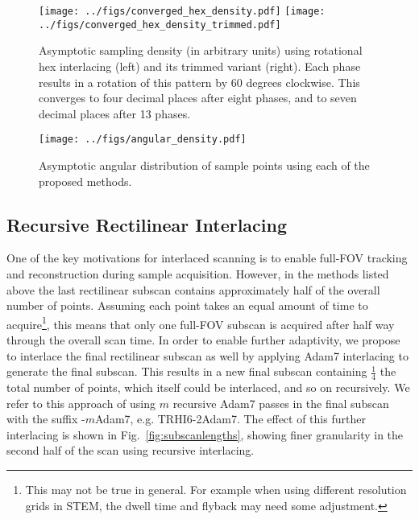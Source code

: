 \documentclass{article}
\newcommand{\reffig}[1]{Fig.~\ref{fig:#1}}
\begin{document}
\begin{figure}[ht]
\centering
\texttt{[image: ../figs/converged\_hex\_density.pdf]}
\texttt{[image: ../figs/converged\_hex\_density\_trimmed.pdf]}
\caption{
\label{fig:hexdensity}
	Asymptotic sampling density (in arbitrary units) using rotational hex interlacing (left) and its trimmed variant (right).
%
Each phase results in a rotation of this pattern by 60 degrees clockwise.
%
This converges to four decimal places after eight phases, and to seven decimal places after 13 phases.
%
%
%
}
\end{figure}


\begin{figure}
\centering
\texttt{[image: ../figs/angular\_density.pdf]}
\caption{
\label{fig:angdens} 
	Asymptotic angular distribution of sample points using each of the proposed methods.
}
\end{figure}

\subsection{Recursive Rectilinear Interlacing}
\label{sec:recursive}

One of the key motivations for interlaced scanning is to enable full-FOV
tracking and reconstruction during sample acquisition.
%
However, in the methods listed above the last rectilinear subscan contains approximately half of the overall number of points.
%
Assuming each point takes an equal amount of time to acquire\footnote{This may not be true in general. For example when using different resolution grids in STEM, the dwell time and flyback may need some adjustment.}, this means that only one full-FOV subscan is acquired after half way through the overall scan time.
%
In order to enable further adaptivity, we propose to interlace the final rectilinear subscan as well by applying Adam7 interlacing to generate the final subscan.
%
This results in a new final subscan containing $\frac{1}{4}$ the total number of points, which itself could be interlaced, and so on recursively.
%
We refer to this approach of using $m$ recursive Adam7 passes in the final subscan with the suffix -$m$Adam7, e.g. TRHI6-2Adam7.
%
The effect of this further interlacing is shown in \reffig{subscanlengths}, showing finer granularity in the second half of the scan using recursive interlacing.
\end{document}
